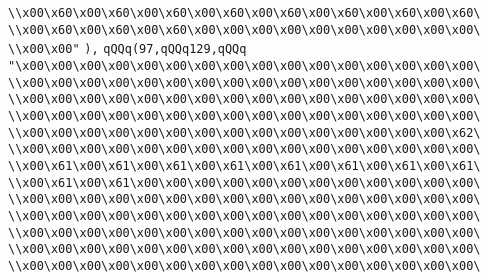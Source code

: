 \verb|\\x00\x60\x00\x60\x00\x60\x00\x60\x00\x60\x00\x60\x00\x60\x00\x60\|\newline
\verb|\\x00\x60\x00\x60\x00\x60\x00\x00\x00\x00\x00\x00\x00\x00\x00\x00\|\newline
\verb|\\x00\x00"|\newline
\verb|),|\newline
\verb|qQQq(97,qQQq129,qQQq|\newline
\verb|"\x00\x00\x00\x00\x00\x00\x00\x00\x00\x00\x00\x00\x00\x00\x00\x00\|\newline
\verb|\\x00\x00\x00\x00\x00\x00\x00\x00\x00\x00\x00\x00\x00\x00\x00\x00\|\newline
\verb|\\x00\x00\x00\x00\x00\x00\x00\x00\x00\x00\x00\x00\x00\x00\x00\x00\|\newline
\verb|\\x00\x00\x00\x00\x00\x00\x00\x00\x00\x00\x00\x00\x00\x00\x00\x00\|\newline
\verb|\\x00\x00\x00\x00\x00\x00\x00\x00\x00\x00\x00\x00\x00\x00\x00\x62\|\newline
\verb|\\x00\x00\x00\x00\x00\x00\x00\x00\x00\x00\x00\x00\x00\x00\x00\x00\|\newline
\verb|\\x00\x61\x00\x61\x00\x61\x00\x61\x00\x61\x00\x61\x00\x61\x00\x61\|\newline
\verb|\\x00\x61\x00\x61\x00\x00\x00\x00\x00\x00\x00\x00\x00\x00\x00\x00\|\newline
\verb|\\x00\x00\x00\x00\x00\x00\x00\x00\x00\x00\x00\x00\x00\x00\x00\x00\|\newline
\verb|\\x00\x00\x00\x00\x00\x00\x00\x00\x00\x00\x00\x00\x00\x00\x00\x00\|\newline
\verb|\\x00\x00\x00\x00\x00\x00\x00\x00\x00\x00\x00\x00\x00\x00\x00\x00\|\newline
\verb|\\x00\x00\x00\x00\x00\x00\x00\x00\x00\x00\x00\x00\x00\x00\x00\x00\|\newline
\verb|\\x00\x00\x00\x00\x00\x00\x00\x00\x00\x00\x00\x00\x00\x00\x00\x00\|\newline
